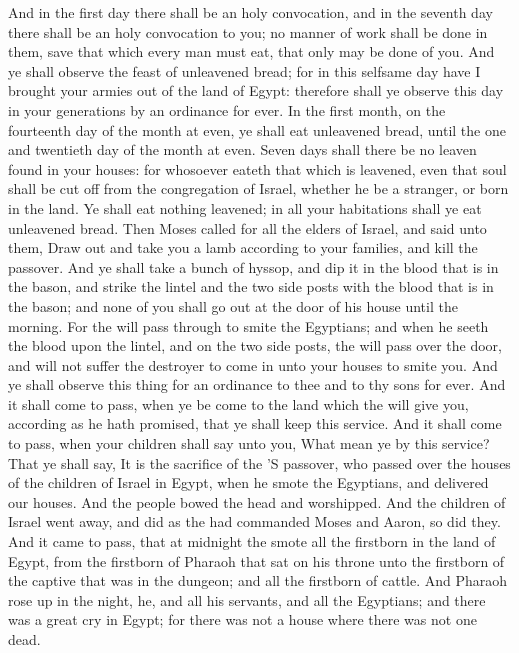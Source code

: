 \begin{biblechapter}
\verse And in the first day there shall be an holy convocation, and in the seventh day there shall be an holy convocation to you; no manner of work shall be done in them, save that which every man must eat, that only may be done of you.
\verse And ye shall observe the feast of unleavened bread; for in this selfsame day have I brought your armies out of the land of Egypt: therefore shall ye observe this day in your generations by an ordinance for ever.
\verse In the first month, on the fourteenth day of the month at even, ye shall eat unleavened bread, until the one and twentieth day of the month at even.
\verse Seven days shall there be no leaven found in your houses: for whosoever eateth that which is leavened, even that soul shall be cut off from the congregation of Israel, whether he be a stranger, or born in the land.
\verse Ye shall eat nothing leavened; in all your habitations shall ye eat unleavened bread.
\verse Then Moses called for all the elders of Israel, and said unto them, Draw out and take you a lamb according to your families, and kill the passover.
\verse And ye shall take a bunch of hyssop, and dip it in the blood that is in the bason, and strike the lintel and the two side posts with the blood that is in the bason; and none of you shall go out at the door of his house until the morning.
\verse For the \LORD will pass through to smite the Egyptians; and when he seeth the blood upon the lintel, and on the two side posts, the \LORD will pass over the door, and will not suffer the destroyer to come in unto your houses to smite you.
\verse And ye shall observe this thing for an ordinance to thee and to thy sons for ever.
\verse And it shall come to pass, when ye be come to the land which the \LORD will give you, according as he hath promised, that ye shall keep this service.
\verse And it shall come to pass, when your children shall say unto you, What mean ye by this service?
\verse That ye shall say, It is the sacrifice of the \LORD'S passover, who passed over the houses of the children of Israel in Egypt, when he smote the Egyptians, and delivered our houses. And the people bowed the head and worshipped.
\verse And the children of Israel went away, and did as the \LORD had commanded Moses and Aaron, so did they.
\verse And it came to pass, that at midnight the \LORD smote all the firstborn in the land of Egypt, from the firstborn of Pharaoh that sat on his throne unto the firstborn of the captive that was in the dungeon; and all the firstborn of cattle.
\verse And Pharaoh rose up in the night, he, and all his servants, and all the Egyptians; and there was a great cry in Egypt; for there was not a house where there was not one dead.

\end{biblechapter}
